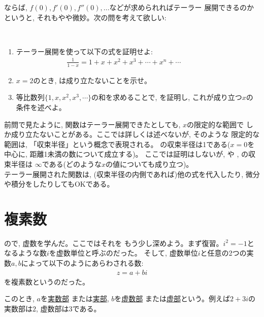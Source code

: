 ならば, $f(0), f'(0), f''(0), ...$などが求められればテーラー
展開できるのかというと, それもやや微妙。次の問を考えて欲しい:\\

\begin{q}\label{q:univ_Taylor4}　
\begin{enumerate}
\item テーラー展開を使って以下の式を証明せよ:
\begin{eqnarray}
\frac{1}{1-x}=1+x+x^2+x^3+\cdots+x^n+\cdots\quad\quad\quad\quad\label{eq:univ_Taylor4}
\end{eqnarray}
\item $x=2$のとき, は成り立たないことを示せ。
\item 等比数列$\{1, x, x^2, x^3, \cdots\}$の和を求めることで, 
を証明し, これが成り立つ$x$の条件を述べよ。
\end{enumerate}
\end{q}\vspace{0.3cm}

前問で見たように, 関数はテーラー展開できたとしても, $x$の限定的な範囲で
しか成り立たないことがある。ここでは詳しくは述べないが, そのような
限定的な範囲は, 「収束半径」という概念で表現される。
の収束半径は1である($x=0$を中心に, 距離1未満の数について成立する)。
ここでは証明はしないが, や
, の収束半径は
$\infty$である(どのような$x$の値についても成り立つ)。\\

テーラー展開された関数は, (収束半径の内側であれば)他の式を代入したり, 
微分や積分をしたりしてもOKである。\hv


\section{複素数}\label{section:alg_complex}

ので, 虚数を学んだ。ここではそれを
もう少し深めよう。まず復習。$i^2=-1$となるような数$i$を虚数単位と呼ぶのだった。
そして, 虚数単位$i$と任意の2つの実数$a, b$によって以下のようにあらわされる数:
\begin{eqnarray}z=a+bi\label{eq:def_complex}\end{eqnarray}
を複素数というのだった。

このとき, $a$を\underline{実数部}
または\underline{実部}, $b$を\underline{虚数部}
または\underline{虚部}という。例えば$2+3i$の実数部は$2$, 虚数部は$3$である。

